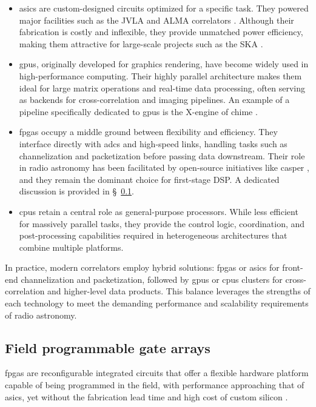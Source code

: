 \begin{itemize}
	\item \Glspl{asic} are custom-designed circuits optimized for a specific task. They powered major facilities such as the JVLA and ALMA correlators \citep{Perley_2009,ALMA_correlator}. Although their fabrication is costly and inflexible, they provide unmatched power efficiency, making them attractive for large-scale projects such as the SKA \citep{D_Addario_2016}.  

	\item \Glspl{gpu}, originally developed for graphics rendering, have become widely used in high-performance computing. Their highly parallel architecture makes them ideal for large matrix operations and real-time data processing, often serving as backends for cross-correlation and imaging pipelines. An example of a pipeline specifically dedicated to \glspl{gpu} is the X-engine of \gls{chime} \citep{recnik2015efficientrealtimedatapipeline}. 

	\item \Glspl{fpga} occupy a middle ground between flexibility and efficiency. They interface directly with \glspl{adc} and high-speed links, handling tasks such as channelization and packetization before passing data downstream. Their role in radio astronomy has been facilitated by open-source initiatives like \Gls{casper} \citep{hickish2016decadedevelopingradioastronomyinstrumentation}, and they remain the dominant choice for first-stage DSP. A dedicated discussion is provided in \S~\ref{sec:fpgas}. 
	\item \glspl{cpu} retain a central role as general-purpose processors. While less efficient for massively parallel tasks, they provide the control logic, coordination, and post-processing capabilities required in heterogeneous architectures that combine multiple platforms. 
\end{itemize} 

 
In practice, modern correlators employ hybrid solutions: \glspl{fpga} or \glspl{asic} for front-end channelization and packetization, followed by \glspl{gpu} or \glspl{cpu} clusters for cross-correlation and higher-level data products. This balance leverages the strengths of each technology to meet the demanding performance and scalability requirements of radio astronomy.

\subsection{Field programmable gate arrays}
\label{sec:fpgas}
\Glspl{fpga} are reconfigurable integrated circuits that offer a flexible hardware platform capable of being programmed in the field, with performance approaching that of \glspl{asic}, yet without the fabrication lead time and high cost of custom silicon \citep{kuon2008fpga}.

